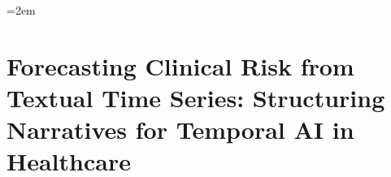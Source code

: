 \begingroup
\ChSevenBegin
\emergencystretch=2em
\chapter{Forecasting Clinical Risk from Textual Time Series: Structuring Narratives for Temporal AI in Healthcare}\label{chap:ch07}

% 















% 

\clearpage
\endgroup
